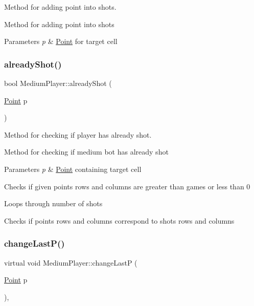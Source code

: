 Method for adding point into shots. 

Method for adding point into shots 
\begin{DoxyParams}{Parameters}
{\em p} & \mbox{\hyperlink{class_point}{Point}} for target cell \\
\hline
\end{DoxyParams}
\mbox{\label{class_medium_player_a0c237af510ff84898759ed2e9a9271ce}} 
\subsubsection{\texorpdfstring{already\+Shot()}{alreadyShot()}}
{\footnotesize\ttfamily bool Medium\+Player\+::already\+Shot (\begin{DoxyParamCaption}\item[{\mbox{\hyperlink{class_point}{Point}}}]{p }\end{DoxyParamCaption})\hspace{0.3cm}{\ttfamily [virtual]}}



Method for checking if player has already shot. 

Method for checking if medium bot has already shot 
\begin{DoxyParams}{Parameters}
{\em p} & \mbox{\hyperlink{class_point}{Point}} containing target cell \\
\hline
\end{DoxyParams}
Checks if given point\textquotesingle{}s rows and columns are greater than game\textquotesingle{}s or less than 0

Loops through number of shots

Checks if point\textquotesingle{}s rows and columns correspond to shot\textquotesingle{}s rows and columns \mbox{\label{class_medium_player_afc952f7dac91d979743154c021d8dee8}} 
\subsubsection{\texorpdfstring{change\+Last\+P()}{changeLastP()}}
{\footnotesize\ttfamily virtual void Medium\+Player\+::change\+LastP (\begin{DoxyParamCaption}\item[{\mbox{\hyperlink{class_point}{Point}}}]{p }\end{DoxyParamCaption})\hspace{0.3cm}{\ttfamily [inline]}, {\ttfamily [virtual]}}



